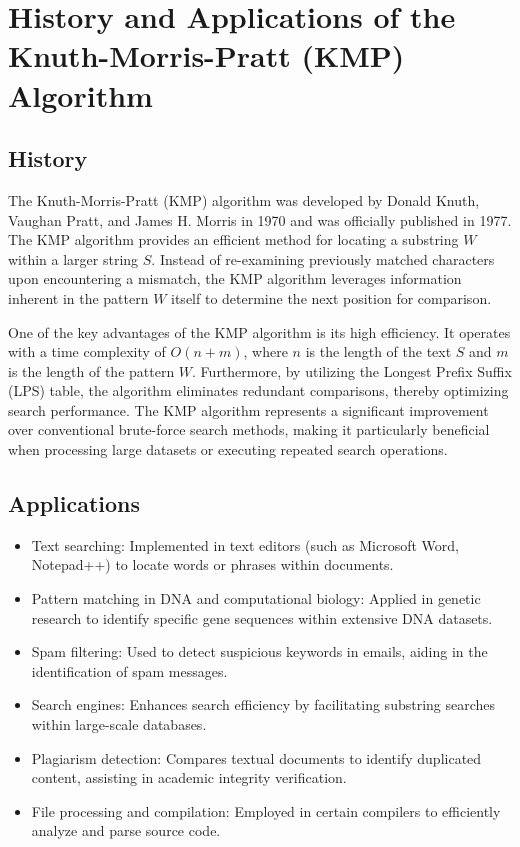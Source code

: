 \section{History and Applications of the Knuth-Morris-Pratt (KMP) Algorithm}
\subsection{History}
The Knuth-Morris-Pratt (KMP) algorithm was developed by Donald Knuth, Vaughan Pratt, and James H. Morris in 1970 and was officially published in 1977. The KMP algorithm provides an efficient method for locating a substring $W$ within a larger string $S$. Instead of re-examining previously matched characters upon encountering a mismatch, the KMP algorithm leverages information inherent in the pattern $W$ itself to determine the next position for comparison.

One of the key advantages of the KMP algorithm is its high efficiency. It operates with a time complexity of $O(n+m)$, where $n$ is the length of the text $S$ and $m$ is the length of the pattern $W$. Furthermore, by utilizing the Longest Prefix Suffix (LPS) table, the algorithm eliminates redundant comparisons, thereby optimizing search performance. The KMP algorithm represents a significant improvement over conventional brute-force search methods, making it particularly beneficial when processing large datasets or executing repeated search operations.

\subsection{Applications}
\begin{itemize}
    \item Text searching: Implemented in text editors (such as Microsoft Word, Notepad++) to locate words or phrases within documents.
    \item Pattern matching in DNA and computational biology: Applied in genetic research to identify specific gene sequences within extensive DNA datasets.
    \item Spam filtering: Used to detect suspicious keywords in emails, aiding in the identification of spam messages.
    \item Search engines: Enhances search efficiency by facilitating substring searches within large-scale databases.
    \item Plagiarism detection: Compares textual documents to identify duplicated content, assisting in academic integrity verification.
    \item File processing and compilation: Employed in certain compilers to efficiently analyze and parse source code.
\end{itemize}